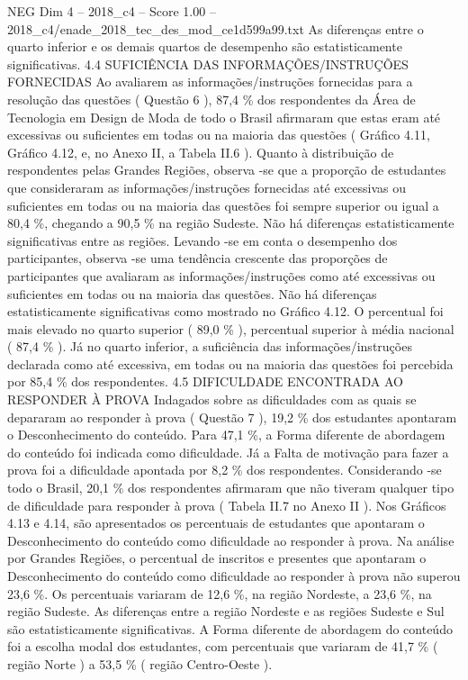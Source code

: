 \begin{textsample}{NEG Dim 4 – 2018\_c4 – Score 1.00 – 2018\_c4/enade\_2018\_tec\_des\_mod\_ce1d599a99.txt}
As diferenças entre o quarto inferior e os demais quartos de desempenho são estatisticamente significativas. 4.4 SUFICIÊNCIA DAS INFORMAÇÕES/INSTRUÇÕES FORNECIDAS Ao avaliarem as informações/instruções fornecidas para a resolução das questões ( Questão 6 ), 87,4 \% dos respondentes da Área de Tecnologia em Design de Moda de todo o Brasil afirmaram que estas eram até excessivas ou suficientes em todas ou na maioria das questões ( Gráfico 4.11, Gráfico 4.12, e, no Anexo II, a Tabela II.6 ).
Quanto à distribuição de respondentes pelas Grandes Regiões, observa -se que a proporção de estudantes que consideraram as informações/instruções fornecidas até excessivas ou suficientes em todas ou na maioria das questões foi sempre superior ou igual a 80,4 \%, chegando a 90,5 \% na região Sudeste.
Não há diferenças estatisticamente significativas entre as regiões.
Levando -se em conta o desempenho dos participantes, observa -se uma tendência crescente das proporções de participantes que avaliaram as informações/instruções como até excessivas ou suficientes em todas ou na maioria das questões.
Não há diferenças estatisticamente significativas como mostrado no Gráfico 4.12.
O percentual foi mais elevado no quarto superior ( 89,0 \% ), percentual superior à média nacional ( 87,4 \% ).
Já no quarto inferior, a suficiência das informações/instruções declarada como até excessiva, em todas ou na maioria das questões foi percebida por 85,4 \% dos respondentes. 4.5 DIFICULDADE ENCONTRADA AO RESPONDER À PROVA Indagados sobre as dificuldades com as quais se depararam ao responder à prova ( Questão 7 ), 19,2 \% dos estudantes apontaram o Desconhecimento do conteúdo.
Para 47,1 \%, a Forma diferente de abordagem do conteúdo foi indicada como dificuldade.
Já a Falta de motivação para fazer a prova foi a dificuldade apontada por 8,2 \% dos respondentes.
Considerando -se todo o Brasil, 20,1 \% dos respondentes afirmaram que não tiveram qualquer tipo de dificuldade para responder à prova ( Tabela II.7 no Anexo II ).
Nos Gráficos 4.13 e 4.14, são apresentados os percentuais de estudantes que apontaram o Desconhecimento do conteúdo como dificuldade ao responder à prova.
Na análise por Grandes Regiões, o percentual de inscritos e presentes que apontaram o Desconhecimento do conteúdo como dificuldade ao responder à prova não superou 23,6 \%.
Os percentuais variaram de 12,6 \%, na região Nordeste, a 23,6 \%, na região Sudeste.
As diferenças entre a região Nordeste e as regiões Sudeste e Sul são estatisticamente significativas.
A Forma diferente de abordagem do conteúdo foi a escolha modal dos estudantes, com percentuais que variaram de 41,7 \% ( região Norte ) a 53,5 \% ( região Centro-Oeste ).

\end{textsample}
